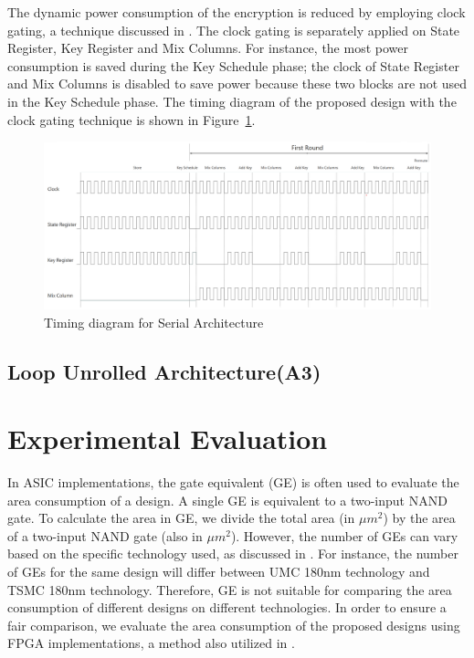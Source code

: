 \documentclass[sn-basic]{sn-jnl}%
\begin{document}
The dynamic power consumption of the encryption is reduced by employing clock gating, a technique discussed in \cite{shahbazi2020area}.
The clock gating is separately applied on State Register, Key Register and Mix Columns.
For instance, the most power consumption is saved during the Key Schedule phase; the clock of State Register and Mix Columns is disabled to save power because these two blocks are not used in the Key Schedule phase.
The timing diagram of the proposed design with the clock gating technique is shown in Figure~\ref{serial_time_diagrm}.

\begin{figure}[h]%
    \centering
    \includegraphics[width=\textwidth]{serial_time.png}
    \caption{Timing diagram for Serial Architecture}\label{serial_time_diagrm}
\end{figure}

\subsection{Loop Unrolled Architecture(A3)}\label{subsec3}

\section{Experimental Evaluation}\label{sec4}

In ASIC implementations, the gate equivalent (GE) is often used to evaluate the area consumption of a design. 
A single GE is equivalent to a two-input NAND gate. 
To calculate the area in GE, we divide the total area (in $\mu m^2$) by the area of a two-input NAND gate (also in $\mu m^2$). 
However, the number of GEs can vary based on the specific technology used, as discussed in \cite{mckay2016report}. 
For instance, the number of GEs for the same design will differ between UMC 180nm technology and TSMC 180nm technology. 
Therefore, GE is not suitable for comparing the area consumption of different designs on different technologies. 
In order to ensure a fair comparison, we evaluate the area consumption of the proposed designs using FPGA implementations, a method also utilized in \cite{mohajerani2020fpga}.
\end{document}
